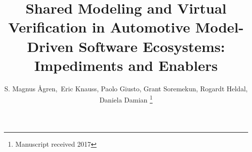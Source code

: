\documentclass[10pt,journal,compsoc,letterpaper]{IEEEtran}
\begin{document}
%
\title{Shared Modeling and Virtual Verification in Automotive Model-Driven Software Ecosystems: Impediments and Enablers}
%
%
%

\author{S. Magnus Ågren,~Eric Knauss, Paolo Giusto, Grant Soremekun, Rogardt Heldal, Daniela Damian%
\thanks{Manuscript received 2017}}
% 
%
\end{document}
